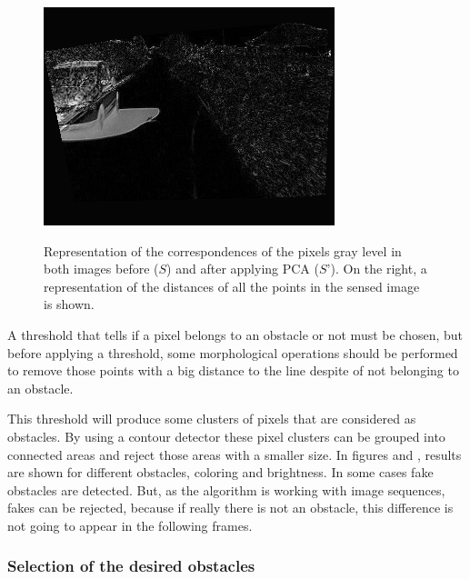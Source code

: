 \begin{figure}[h!]
\begin{minipage}{0.3\textwidth}
\end{minipage}
\begin{minipage}{0.3\textwidth}
    \centering
    \includegraphics[width=\textwidth]{pca3}\label{fig:cp02_pca3}
\end{minipage}
\caption{Representation of the correspondences of the pixels gray level in both images before ($S$) and after applying PCA ($S’$). On the right, a representation of the distances of all the points in the sensed image is shown.}\label{fig:cp02_pca}
\end{figure}

A threshold that tells if a pixel belongs to an obstacle or not must be chosen, but before applying a threshold, some morphological operations should be performed to remove those points with a big distance to the line despite of not belonging to an obstacle.

This threshold will produce some clusters of pixels that are considered as obstacles. By using a contour detector these pixel clusters can be grouped into connected areas and reject those areas with a smaller size. In figures  and , results are shown for different obstacles, coloring and brightness. In some cases fake obstacles are detected. But, as the algorithm is working with image sequences, fakes can be rejected, because if really there is not an obstacle, this difference is not going to appear in the following frames.

\subsubsection{Selection of the desired obstacles}\label{ch:chapter02_01_03_03}

